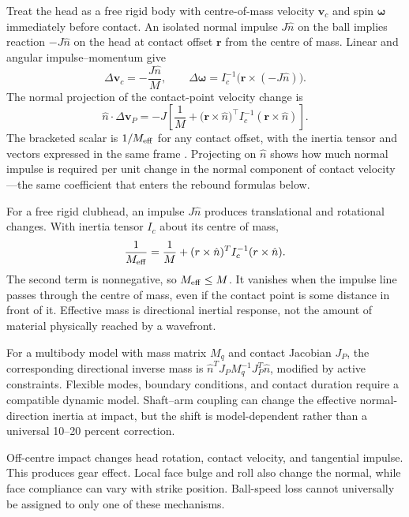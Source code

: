 Treat the head as a free rigid body with centre-of-mass velocity $\mathbf v_c$
and spin $\boldsymbol\omega$ immediately before contact. An isolated normal
impulse $J\hat n$ on the ball implies reaction $-J\hat n$ on the head at
contact offset $\mathbf r$ from the centre of mass. Linear and angular
impulse--momentum give
\begin{equation}
\Delta\mathbf v_c=-\frac{J\hat n}{M},\qquad
\Delta\boldsymbol\omega=I_c^{-1}\bigl(\mathbf r\times(-J\hat n)\bigr).
\end{equation}
The normal projection of the contact-point velocity change is
\begin{equation}
\hat n\cdot\Delta\mathbf v_P
=-J\left[\frac{1}{M}+\bigl(\mathbf r\times\hat n\bigr)^\top I_c^{-1}(\mathbf r\times\hat n)\right].
\end{equation}
The bracketed scalar is $1/M_{\rm eff}$ for any contact offset, with the
inertia tensor and vectors expressed in the same frame \citep{Jorgensen1994,Penner2003}.
Projecting on $\hat n$ shows how much normal impulse is required per unit
change in the normal component of contact velocity---the same coefficient that
enters the rebound formulas below.

For a free rigid clubhead, an impulse $J\hat n$ produces translational and
rotational changes. With inertia tensor $I_c$ about its centre of mass,
\begin{equation}
\frac{1}{M_{\rm eff}}=\frac1M+
(r\times\hat n)^T I_c^{-1}(r\times\hat n).
\end{equation}
The second term is nonnegative, so $M_{\rm eff}\le M$. It vanishes when
the impulse line passes through the centre of mass, even if the contact point
is some distance in front of it. Effective mass is directional inertial
response, not the amount of material physically reached by a wavefront.

For a multibody model with mass matrix $M_q$ and contact Jacobian $J_P$,
the corresponding directional inverse mass is
$\hat n^TJ_PM_q^{-1}J_P^T\hat n$, modified by active constraints.
Flexible modes, boundary conditions, and contact duration require a compatible
dynamic model. Shaft--arm coupling can change the effective normal-direction
inertia at impact, but the shift is model-dependent rather than a universal
10--20 percent correction.

Off-centre impact changes head rotation, contact velocity, and tangential
impulse. This produces gear effect. Local face bulge and roll also change the
normal, while face compliance can vary with strike position. Ball-speed loss
cannot universally be assigned to only one of these mechanisms.

